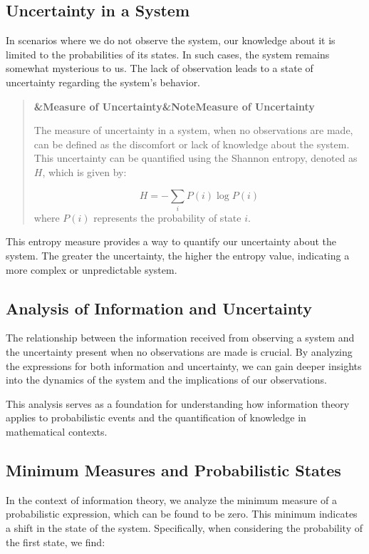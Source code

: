 \documentclass[a4paper]{article}
\newcommand{\boxheading}[1]{%
  \par\smallskip
  \noindent\textbf{\ifx&#1&Note\else#1\fi}\par
  \smallskip
}
\newenvironment{defbox}[1][]{%
  \begin{quote}\color{green!40!black}\boxheading{#1}\normalcolor
}{\end{quote}}
\begin{document}
\subsection{Uncertainty in a System}
In scenarios where we do not observe the system, our knowledge about it is limited to the probabilities of its states. In such cases, the system remains somewhat mysterious to us. The lack of observation leads to a state of uncertainty regarding the system's behavior.

\begin{defbox}[Measure of Uncertainty]
The measure of uncertainty in a system, when no observations are made, can be defined as the discomfort or lack of knowledge about the system. This uncertainty can be quantified using the Shannon entropy, denoted as \(H\), which is given by:

\begin{equation}
H = -\sum_{i} P(i) \log P(i)
\end{equation}
where \(P(i)\) represents the probability of state \(i\).
\end{defbox}

This entropy measure provides a way to quantify our uncertainty about the system. The greater the uncertainty, the higher the entropy value, indicating a more complex or unpredictable system.

\subsection{Analysis of Information and Uncertainty}
The relationship between the information received from observing a system and the uncertainty present when no observations are made is crucial. By analyzing the expressions for both information and uncertainty, we can gain deeper insights into the dynamics of the system and the implications of our observations. 

This analysis serves as a foundation for understanding how information theory applies to probabilistic events and the quantification of knowledge in mathematical contexts.

\subsection{Minimum Measures and Probabilistic States}
In the context of information theory, we analyze the minimum measure of a probabilistic expression, which can be found to be zero. This minimum indicates a shift in the state of the system. Specifically, when considering the probability of the first state, we find:
\end{document}
